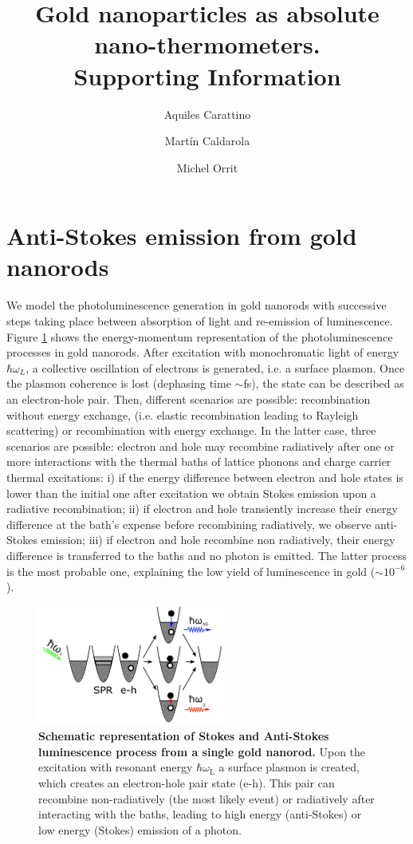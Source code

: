 \documentclass[journal=nalefd,manuscript=letter]{achemso}
\author{Aquiles Carattino}
\affiliation[Leiden]
{Huygens-Kamerlingh Onnes Lab, 2300RA Leiden, The Netherlands}
\author{Mart\'in Caldarola}
\affiliation[Leiden]
{Huygens-Kamerlingh Onnes Lab, 2300RA Leiden, The Netherlands}
\author{Michel Orrit}
\affiliation[Leiden]
{Huygens-Kamerlingh Onnes Lab, 2300RA Leiden, The Netherlands}
\title{Gold nanoparticles as absolute nano-thermometers. \\
Supporting Information}
\begin{document}
\maketitle


\section{Anti-Stokes emission from gold nanorods}\label{sec:AS}

We model the photoluminescence generation in gold nanorods with successive 
steps taking place between absorption of light and re-emission of luminescence\cite{Carattino2016a}. 
Figure \ref{fig:anti-Stokes-process} shows the energy-momentum representation
of the photoluminescence processes in gold nanorods. 
After excitation with monochromatic light of energy $\hbar \omega_L$, 
a collective oscillation of electrons is generated, i.e. a surface plasmon. 
Once the plasmon coherence is lost (dephasing time $\sim$fs), the state can be described as an
electron-hole pair. Then, different scenarios are possible: recombination 
without energy exchange, (i.e. elastic recombination leading to Rayleigh scattering) or 
recombination with energy exchange. In the latter case, three scenarios are possible: electron and hole may
recombine radiatively after one or more interactions with the thermal baths of
lattice phonons and charge carrier thermal excitations: i) if the energy
difference between electron and hole states is lower than the initial one after
excitation we obtain Stokes emission upon a radiative recombination; ii) if
electron and hole transiently increase their energy difference at the bath's
expense before recombining radiatively, we observe anti-Stokes emission; iii) if
electron and hole recombine non radiatively, their energy difference is
transferred to the baths and no photon is emitted. The latter process is the
most probable one, explaining the low yield of luminescence in gold ($\sim 10^{-6}$). 

\begin{figure}[htp] \centering
\includegraphics[width=0.55\textwidth]{Figures/Supplementary/01_AS_Scheme/luminescence_all_AS.png}
\caption{\textbf{Schematic representation of Stokes and Anti-Stokes luminescence process from a single gold nanorod.} 
Upon the excitation with resonant energy $\hbar \omega_\textrm{L}$ a surface plasmon is created, which creates 
an electron-hole pair state (e-h). This pair can recombine non-radiatively (the most likely event) or radiatively
after interacting with the baths, leading to high energy (anti-Stokes) or low energy (Stokes) emission of a photon.}
	\label{fig:anti-Stokes-process}
\end{figure}
\end{document}

